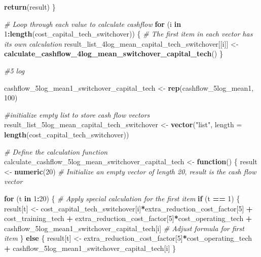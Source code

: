 \documentclass[
]{article}
\newenvironment{Shaded}{\begin{snugshade}}{\end{snugshade}}
\newcommand{\AttributeTok}[1]{\textcolor[rgb]{0.13,0.29,0.53}{#1}}
\newcommand{\CommentTok}[1]{\textcolor[rgb]{0.56,0.35,0.01}{\textit{#1}}}
\newcommand{\ControlFlowTok}[1]{\textcolor[rgb]{0.13,0.29,0.53}{\textbf{#1}}}
\newcommand{\DecValTok}[1]{\textcolor[rgb]{0.00,0.00,0.81}{#1}}
\newcommand{\FunctionTok}[1]{\textcolor[rgb]{0.13,0.29,0.53}{\textbf{#1}}}
\newcommand{\NormalTok}[1]{#1}
\newcommand{\OtherTok}[1]{\textcolor[rgb]{0.56,0.35,0.01}{#1}}
\newcommand{\SpecialCharTok}[1]{\textcolor[rgb]{0.81,0.36,0.00}{\textbf{#1}}}
\newcommand{\StringTok}[1]{\textcolor[rgb]{0.31,0.60,0.02}{#1}}
\begin{document}
\begin{Shaded}
\begin{Highlighting}[]
  \FunctionTok{return}\NormalTok{(result)}
\NormalTok{\}}

\CommentTok{\# Loop through each value to calculate cashflow}
\ControlFlowTok{for}\NormalTok{ (i }\ControlFlowTok{in} \DecValTok{1}\SpecialCharTok{:}\FunctionTok{length}\NormalTok{(cost\_capital\_tech\_switchover)) \{}
  \CommentTok{\# The first item in each vector has its own calculation}
\NormalTok{  result\_list\_4log\_mean\_capital\_tech\_switchover[[i]] }\OtherTok{\textless{}{-}} \FunctionTok{calculate\_cashflow\_4log\_mean\_switchover\_capital\_tech}\NormalTok{()}
\NormalTok{\}}


\CommentTok{\#5 log}

\NormalTok{cashflow\_5log\_mean1\_switchover\_capital\_tech }\OtherTok{\textless{}{-}} \FunctionTok{rep}\NormalTok{(cashflow\_5log\_mean1, }\DecValTok{100}\NormalTok{)}

\CommentTok{\#initialize empty list to store cash flow vectors}
\NormalTok{result\_list\_5log\_mean\_capital\_tech\_switchover }\OtherTok{\textless{}{-}} \FunctionTok{vector}\NormalTok{(}\StringTok{"list"}\NormalTok{, }\AttributeTok{length =} \FunctionTok{length}\NormalTok{(cost\_capital\_tech\_switchover))}


\CommentTok{\# Define the calculation function}
\NormalTok{calculate\_cashflow\_5log\_mean\_switchover\_capital\_tech }\OtherTok{\textless{}{-}} \ControlFlowTok{function}\NormalTok{() \{}
\NormalTok{  result }\OtherTok{\textless{}{-}} \FunctionTok{numeric}\NormalTok{(}\DecValTok{20}\NormalTok{)  }\CommentTok{\# Initialize an empty vector of length 20, result is the cash flow vector}
  
  \ControlFlowTok{for}\NormalTok{ (t }\ControlFlowTok{in} \DecValTok{1}\SpecialCharTok{:}\DecValTok{20}\NormalTok{) \{}
    \CommentTok{\# Apply special calculation for the first item}
    \ControlFlowTok{if}\NormalTok{ (t }\SpecialCharTok{==} \DecValTok{1}\NormalTok{) \{}
\NormalTok{      result[t] }\OtherTok{\textless{}{-}}\NormalTok{ cost\_capital\_tech\_switchover[i]}\SpecialCharTok{*}\NormalTok{extra\_reduction\_cost\_factor[}\DecValTok{5}\NormalTok{] }\SpecialCharTok{+}\NormalTok{ cost\_training\_tech }\SpecialCharTok{+}\NormalTok{ extra\_reduction\_cost\_factor[}\DecValTok{5}\NormalTok{]}\SpecialCharTok{*}\NormalTok{cost\_operating\_tech }\SpecialCharTok{+}\NormalTok{ cashflow\_5log\_mean1\_switchover\_capital\_tech[i] }\CommentTok{\# Adjust formula for first item}
\NormalTok{    \} }\ControlFlowTok{else}\NormalTok{ \{}
\NormalTok{      result[t] }\OtherTok{\textless{}{-}}\NormalTok{ extra\_reduction\_cost\_factor[}\DecValTok{5}\NormalTok{]}\SpecialCharTok{*}\NormalTok{cost\_operating\_tech }\SpecialCharTok{+}\NormalTok{ cashflow\_5log\_mean1\_switchover\_capital\_tech[i]}
\NormalTok{    \}}
    

\end{Highlighting}
\end{Shaded}
\end{document}
